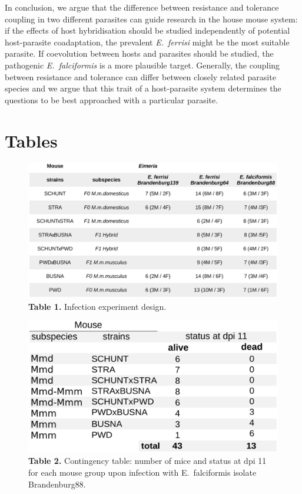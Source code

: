 \documentclass[12pt]{article}
\begin{document}
In conclusion, we argue that the difference between resistance and tolerance coupling in two different parasites can guide research in the house mouse system: if the effects of host hybridisation should be studied independently of potential host-parasite coadaptation, the prevalent \textit{E.~ferrisi} might be the most suitable parasite. If coevolution between hosts and parasites should be studied, the pathogenic \textit{E.~falciformis} is a more plausible target. Generally, the coupling between resistance and tolerance can differ between closely related parasite species and we argue that this trait of a host-parasite system determines the questions to be best approached with a particular parasite. 

\printbibliography

\section*{Tables}

\begin{figure}[H]
	\centering
	\includegraphics[width=\linewidth,height=\textheight,keepaspectratio]{images/Table1_final.pdf}
	\captionsetup{labelformat=empty}
	\caption{\textbf{Table 1.} Infection experiment design.}
\end{figure}
\addtocounter{figure}{-1}

\begin{figure}[H]
	\centering
	\includegraphics[width=\linewidth,height=\textheight,keepaspectratio]{images/Table2_final.pdf}
	\captionsetup{labelformat=empty}
	\caption{\textbf{Table 2.} Contingency table: number of mice and status at dpi 11 for each mouse group upon infection with E. falciformis isolate Brandenburg88.}
\end{figure}
\addtocounter{figure}{-1}
\end{document}
